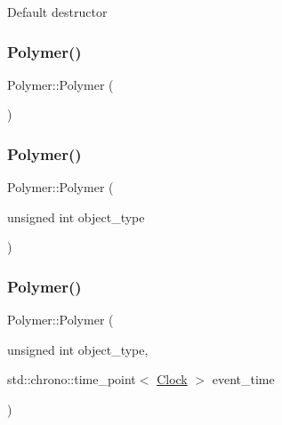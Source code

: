 Default destructor \mbox{\label{classPolymer_a0f7d915300bfec223c4025f8e9d4f46d}} 
\subsubsection{\texorpdfstring{Polymer()}{Polymer()}\hspace{0.1cm}{\footnotesize\ttfamily [10/14]}}
{\footnotesize\ttfamily Polymer\+::\+Polymer (\begin{DoxyParamCaption}{ }\end{DoxyParamCaption})\hspace{0.3cm}{\ttfamily [inline]}}

\mbox{\label{classPolymer_adb35b8b7a5eae1e39187c0e525b0d9b1}} 
\subsubsection{\texorpdfstring{Polymer()}{Polymer()}\hspace{0.1cm}{\footnotesize\ttfamily [11/14]}}
{\footnotesize\ttfamily Polymer\+::\+Polymer (\begin{DoxyParamCaption}\item[{unsigned int}]{object\+\_\+type }\end{DoxyParamCaption})\hspace{0.3cm}{\ttfamily [inline]}}

\mbox{\label{classPolymer_af918b8776cfd76d9ae4611bf35d4192a}} 
\subsubsection{\texorpdfstring{Polymer()}{Polymer()}\hspace{0.1cm}{\footnotesize\ttfamily [12/14]}}
{\footnotesize\ttfamily Polymer\+::\+Polymer (\begin{DoxyParamCaption}\item[{unsigned int}]{object\+\_\+type,  }\item[{std\+::chrono\+::time\+\_\+point$<$ \mbox{\hyperlink{universe_8h_a0ef8d951d1ca5ab3cfaf7ab4c7a6fd80}{Clock}} $>$}]{event\+\_\+time }\end{DoxyParamCaption})\hspace{0.3cm}{\ttfamily [inline]}}

